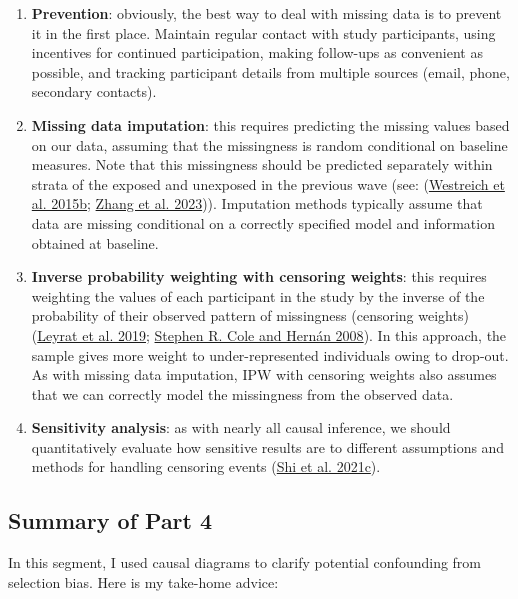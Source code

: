 \documentclass[
  singlecolumn]{report}
\begin{document}
\begin{enumerate}
\def\labelenumi{\arabic{enumi}.}
\item
  \textbf{Prevention}: obviously, the best way to deal with missing data
  is to prevent it in the first place. Maintain regular contact with
  study participants, using incentives for continued participation,
  making follow-ups as convenient as possible, and tracking participant
  details from multiple sources (email, phone, secondary contacts).
\item
  \textbf{Missing data imputation}: this requires predicting the missing
  values based on our data, assuming that the missingness is random
  conditional on baseline measures. Note that this missingness should be
  predicted separately within strata of the exposed and unexposed in the
  previous wave (see: (\protect\hyperlink{ref-westreich2015a}{Westreich
  et al. 2015b}; \protect\hyperlink{ref-zhang2023}{Zhang et al. 2023})).
  Imputation methods typically assume that data are missing conditional
  on a correctly specified model and information obtained at baseline.
\item
  \textbf{Inverse probability weighting with censoring weights}: this
  requires weighting the values of each participant in the study by the
  inverse of the probability of their observed pattern of missingness
  (censoring weights)(\protect\hyperlink{ref-leyrat2019}{Leyrat et al.
  2019}; \protect\hyperlink{ref-cole2008}{Stephen R. Cole and Hernán
  2008}). In this approach, the sample gives more weight to
  under-represented individuals owing to drop-out. As with missing data
  imputation, IPW with censoring weights also assumes that we can
  correctly model the missingness from the observed data.
\item
  \textbf{Sensitivity analysis}: as with nearly all causal inference, we
  should quantitatively evaluate how sensitive results are to different
  assumptions and methods for handling censoring events
  (\protect\hyperlink{ref-shi2021a}{Shi et al. 2021c}).
\end{enumerate}

\hypertarget{summary-of-part-4}{%
\subsection{Summary of Part 4}\label{summary-of-part-4}}

In this segment, I used causal diagrams to clarify potential confounding
from selection bias. Here is my take-home advice:
\end{document}
